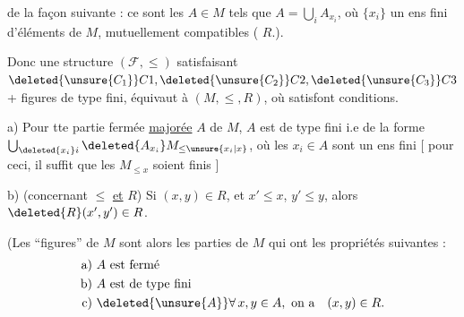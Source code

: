 de la façon suivante : ce sont les $A\in M$ tels que $A=\bigcup_i A_{x_i}$, où  $\{x_i\}$  un ens fini d'éléments de $M$, mutuellement compatibles ( $R$.).

Donc une structure $(\mathcal F,\leq)$ satisfaisant $\deleted{\unsure{C_1}}C1,\deleted{\unsure{C_2}}C2,\deleted{\unsure{C_3}}C3$ + figures  de type fini, équivaut à $(M,\leq,R)$, où   satisfont  conditions.

a)  Pour tte partie fermée \uline{majorée} $A$\deleted{\unsure{,}} de $M$, $A$ est de type fini i.e de la forme $\bigcup_{\deleted{x_i}i}\deleted{A_{x_i}}M_{\leq\unsure{x_i|x}}$, où les $x_i\in A$  sont un ens fini [ pour ceci, il suffit que les $M_{\leq x}$ soient finis ]


b) (concernant $\leq$ \uline{et} $R$) Si $(x,y)\in R$, et $x'\leq x$, $y'\leq y$, alors $\deleted{R}(x',y')\in R$.


(Les ``figures'' de $M$ sont alors les parties  de $M$ qui ont les propriétés suivantes :
\[
\begin{aligned}
\text{a) } & A\text{ est fermé}\\
\text{b) } & A\text{ est de type fini}\\
\text{c) } & \deleted{\unsure{A}}\forall\,x,y\in A,\ \text{on a}\quad (x,y)\in R.
\end{aligned}
\]
